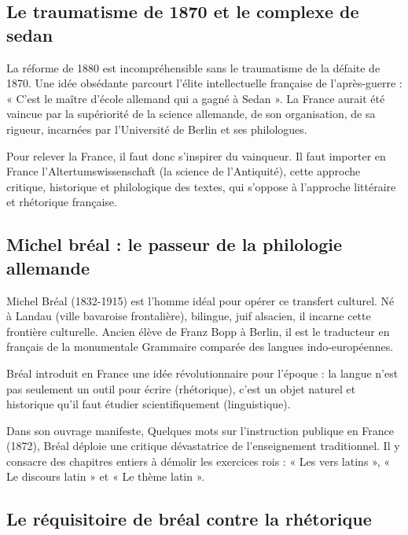 \subsection{Le traumatisme de 1870 et le complexe de sedan}

La réforme de 1880 est incompréhensible sans le traumatisme de la défaite de 1870. Une idée
obsédante parcourt l'élite intellectuelle française de l'après-guerre : « C'est le maître d'école
allemand qui a gagné à Sedan ».\cite{I-1-2-ref13} La France aurait été vaincue par la supériorité de
la science allemande, de son organisation, de sa rigueur, incarnées par l'Université de Berlin et
ses philologues.\cite{I-1-2-ref4}

Pour relever la France, il faut donc s'inspirer du vainqueur. Il faut importer en France
l'Altertumswissenschaft (la science de l'Antiquité), cette approche critique, historique et
philologique des textes, qui s'oppose à l'approche littéraire et rhétorique française.



\subsection{Michel bréal : le passeur de la philologie allemande}

Michel Bréal (1832-1915) est l'homme idéal pour opérer ce transfert culturel. Né à Landau (ville
bavaroise frontalière), bilingue, juif alsacien, il incarne cette frontière culturelle. Ancien élève
de Franz Bopp à Berlin, il est le traducteur en français de la monumentale Grammaire comparée des
langues indo-européennes.\cite{I-1-2-ref13}

Bréal introduit en France une idée révolutionnaire pour l'époque : la langue n'est pas seulement un
outil pour écrire (rhétorique), c'est un objet naturel et historique qu'il faut étudier
scientifiquement (linguistique).

Dans son ouvrage manifeste, Quelques mots sur l'instruction publique en France (1872), Bréal déploie
une critique dévastatrice de l'enseignement traditionnel. Il y consacre des chapitres entiers à
démolir les exercices rois : « Les vers latins », « Le discours latin » et « Le thème latin
».\cite{I-1-2-ref17}



\subsection{Le réquisitoire de bréal contre la rhétorique}

